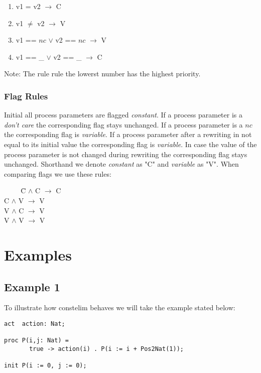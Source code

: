 \documentclass[a4paper,9pt]{article}
\begin{document}
\begin{enumerate}
\item  v1 = v2 $\rightarrow$ C 
\item v1 $\neq$ v2 $\rightarrow$ V 
\item v1 == $nc$ $\vee$ v2 == $nc$ $\rightarrow$ V
\item v1 == \_ $\vee$ v2 == \_ $\rightarrow$ C 
\end{enumerate}
Note: The rule rule the lowerst number has the highest priority.

\subsubsection*{Flag Rules} 
Initial all process parameters are flagged \textit{constant}.
If a process parameter is a \textit{don't care} the corresponding flag stays unchanged.
If a process parameter is a $nc$ the corresponding flag is \textit{variable}.
If a process parameter after a rewriting in not equal to its initial value the corresponding flag is \textit{variable}.
In case the value of the process parameter is not changed during rewriting the corresponding flag stays unchanged.
Shorthand we denote \textit{constant} as "C" and \textit{variable} as "V". When comparing flags we use these rules: 
\begin{tabbing}
\verb"    " \= C $\wedge$ C $\rightarrow$ C \\
\> C $\wedge$ V $\rightarrow$ V \\
\> V $\wedge$ C $\rightarrow$ V \\
\> V $\wedge$ V $\rightarrow$ V \\
\end{tabbing}
\section{Examples}
\subsection{Example 1}
To illustrate how constelim behaves we will take the example stated below:
\begin{verbatim}
act  action: Nat;

proc P(i,j: Nat) =
       true -> action(i) . P(i := i + Pos2Nat(1));

init P(i := 0, j := 0);
\end{verbatim}
\end{document}

